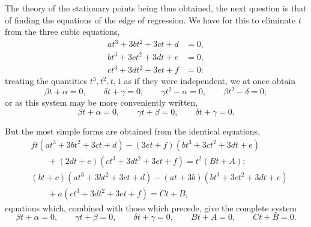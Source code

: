 \documentclass[11pt]{article}
\begin{document}
The theory of the stationary points being thus obtained, the next question is that of
finding the equations of the edge of regression. We have for this to eliminate $t$
from the three cubic equations,
\[
\begin{aligned}
at^3+3bt^2+3ct+d&=0,\\
bt^3+3ct^2+3dt+e&=0,\\
ct^3+3dt^2+3et+f&=0:
\end{aligned}
\]
treating the quantities $t^3,t^2,t,1$ as if they were independent, we at once obtain
\[
        \beta t+\alpha=0,\qquad
        \delta t+\gamma=0,\qquad
        \gamma t^2-\alpha=0,\qquad
        \beta t^2-\delta=0;
\]
or as this system may be more conveniently written,
\[
        \beta t+\alpha=0,\qquad
        \gamma t+\beta=0,\qquad
        \delta t+\gamma=0.
\]

But the most simple forms are obtained from the identical equations,
\[
\begin{aligned}
&ft(at^3+3bt^2+3ct+d)
 -(3et+f)(bt^3+3ct^2+3dt+e)\\
&\qquad +(2dt+e)(ct^3+3dt^2+3et+f)=t^2(Bt+A);\\
&(bt+c)(at^3+3bt^2+3ct+d)
 -(at+3b)(bt^3+3ct^2+3dt+e)\\
&\qquad +a(ct^3+3dt^2+3et+f)=Ct+B,
\end{aligned}
\]
equations which, combined with those which precede, give the complete system
\[
        \beta t+\alpha=0,\qquad
        \gamma t+\beta=0,\qquad
        \delta t+\gamma=0,\qquad
        Bt+A=0,\qquad
        Ct+B=0.
\]
\end{document}
